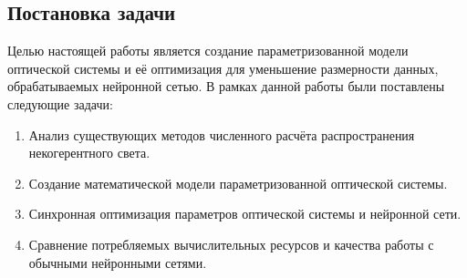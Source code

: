 \subsection{Постановка задачи}
Целью настоящей работы является создание параметризованной модели оптической системы и её оптимизация для уменьшение размерности данных, обрабатываемых нейронной сетью. В рамках данной работы были поставлены следующие задачи:
\begin{enumerate}
	\item
	Анализ существующих методов численного расчёта распространения некогерентного света.
	
	\item
	Создание математической модели параметризованной оптической системы.
	
	\item
	Синхронная оптимизация параметров оптической системы и нейронной сети.
	
	\item
	Сравнение потребляемых вычислительных ресурсов и качества работы с обычными нейронными сетями.
\end{enumerate}
